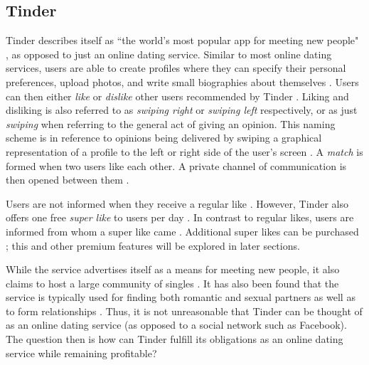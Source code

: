 \subsection{Tinder}

Tinder describes itself as ``the world's most popular app for meeting new people" \citep{TinderWhatIs}, as opposed to just an online dating service. Similar to most online dating services, users are able to create profiles where they can specify their personal preferences, upload photos, and write small biographies about themselves \citep{Courtois2018}. Users can then either \textit{like} or \textit{dislike} other users recommended by Tinder \citep{Courtois2018}. Liking and disliking is also referred to as \textit{swiping right} or \textit{swiping left} respectively, or as just \textit{swiping} when referring to the general act of giving an opinion. This naming scheme is in reference to opinions being delivered by swiping a graphical representation of a profile to the left or right side of the user's screen \citep{TinderWhatIs}. A \textit{match} is formed when two users like each other. A private channel of communication is then opened between them \citep{Courtois2018}.

Users are not informed when they receive a regular like \citep{TinderWhatIs}. However, Tinder also offers one free \textit{super like} to users per day \citep{TinderSuperLike}. In contrast to regular likes, users are informed from whom a super like came \citep{TinderSuperLike}. Additional super likes can be purchased \citep{TinderSuperLike}; this and other premium features will be explored in later sections.

While the service advertises itself as a means for meeting new people, it also claims to host a large community of singles \citep{TinderWhatIs}. It has also been found that the service is typically used for finding both romantic and sexual partners as well as to form relationships \citep{Gatter2016}. Thus, it is not unreasonable that Tinder can be thought of as an online dating service (as opposed to a social network such as Facebook). The question then is how can Tinder fulfill its obligations as an online dating service while remaining profitable? 